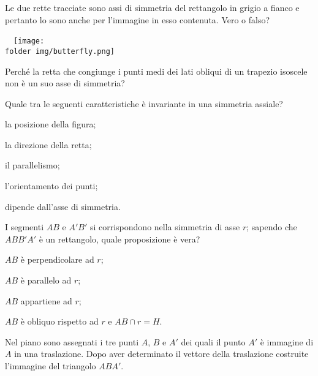 \noindent\begin{minipage}{0.75\textwidth}\parindent15pt
\begin{esercizio}
	\label{ese:8.25}
	Le due rette tracciate sono assi di simmetria del rettangolo 
in grigio a fianco e pertanto lo sono anche per l'immagine in esso 
contenuta. Vero o falso?
\end{esercizio}
\end{minipage}\hfil
\begin{minipage}{0.25\textwidth}
	
\centering~~\texttt{[image: \\folder img/butterfly.png]}
\end{minipage}%

\begin{esercizio}
\label{ese:8.26}
Perché la retta che congiunge i punti medi dei lati obliqui di un 
trapezio isoscele non è un suo asse di simmetria?
\end{esercizio}


\begin{esercizio}
\label{ese:8.40} %
Quale tra le seguenti caratteristiche è invariante in una simmetria 
assiale?
\begin{enumeratea}
\item la posizione della figura;
\item la direzione della retta;
\item il parallelismo;
\item l'orientamento dei punti;
\item dipende dall'asse di simmetria.
\end{enumeratea}
\end{esercizio}

\begin{esercizio}
\label{ese:8.41} %
I segmenti $AB$ e $A'B'$ si corrispondono nella simmetria di asse 
$r$; sapendo che $ABB'A'$ è un rettangolo, quale proposizione è vera?
\begin{enumeratea}
\item $AB$ è perpendicolare ad $r$;
\item $AB$ è parallelo ad $r$;
\item $AB$ appartiene ad $r$;
\item $AB$ è obliquo rispetto ad $r$ e $AB\cap r=H$.
\end{enumeratea}
\end{esercizio}

\begin{esercizio}
\label{ese:8.44} %
Nel piano sono assegnati i tre punti $A$, $B$ e $A'$ dei quali il 
punto $A'$ è immagine di $A$ in una traslazione. Dopo aver 
determinato il vettore della traslazione costruite l'immagine del 
triangolo $ABA'$.
\end{esercizio}
\begin{minipage}{0.25\textwidth}
	\centering~~
\end{minipage}\vspace{8pt}

